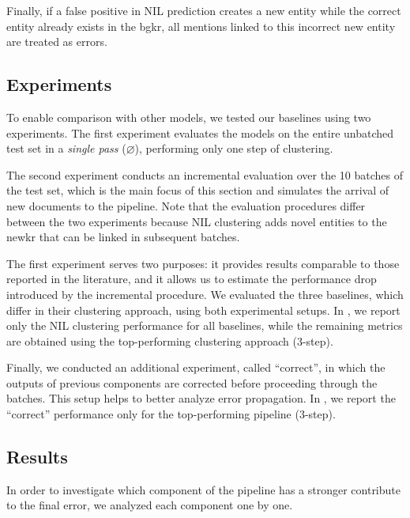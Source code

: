 Finally, if a false positive in NIL prediction creates a new entity while the correct entity already exists in the \ac{bgkr}, all mentions linked to this incorrect new entity are treated  as errors.

\subsection{Experiments}
\label{sec:ijckg:experiments}

To enable comparison with other models, we tested our baselines using two experiments. The first experiment evaluates the models on the entire unbatched test set in a \emph{single pass} ($\varnothing$), performing only one step of clustering. 

The second experiment conducts an incremental evaluation over the 10 batches of the test set, which is the main focus of this section and simulates the arrival of new documents to the pipeline. Note that the evaluation procedures differ between the two experiments because NIL clustering adds novel entities to the \ac{newkr} that can be linked in subsequent batches.

The first experiment serves two purposes: it provides results comparable to those reported in the literature, and it allows us to estimate the performance drop introduced by the incremental procedure. We evaluated the three baselines, which differ in their clustering approach, using both experimental setups. In , we report only the NIL clustering performance for all baselines, while the remaining metrics are obtained using the top-performing clustering approach (3-step).

Finally, we conducted an additional experiment, called ``correct'', in which the outputs of previous components are corrected before proceeding through the batches. This setup helps to better analyze error propagation. In , we report the ``correct'' performance only for the top-performing pipeline (3-step).




\subsection{Results}
\label{sec:ijckg:results}
In order to investigate which component of the pipeline has a stronger contribute to the final error, we analyzed each component one by one.

